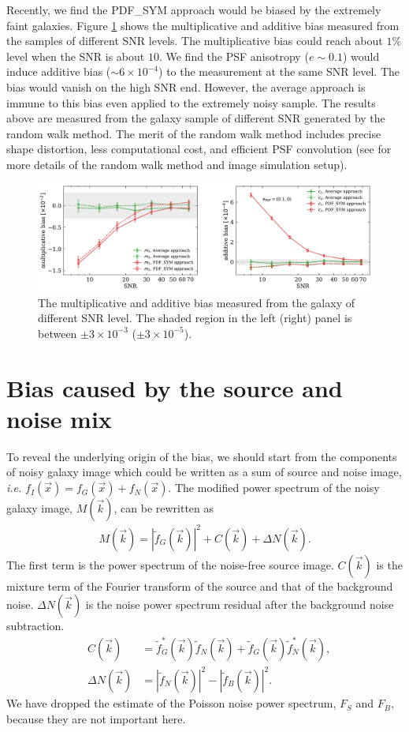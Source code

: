 \documentclass[twocolumn]{aastex62}
\def\ie{{\it i.e. }}
\begin{document}
Recently, we find the PDF\_SYM approach would be biased by the extremely faint galaxies. Figure \ref{fig:pts_mc} shows the multiplicative and additive bias measured from the samples of different SNR levels. The multiplicative bias could reach about $1\%$ level when the SNR is about $10$. We find the PSF anisotropy ($e \sim 0.1$) would induce additive bias ($\sim 6\times 10^{-4}$) to the measurement at the same SNR level. The bias would vanish on the high SNR end. However, the average approach is immune to this bias even applied to the extremely noisy sample. The results above are measured from the galaxy sample of different SNR generated by the random walk method. The merit of the random walk method includes precise shape distortion, less computational cost, and efficient PSF convolution (see \cite{Li2020} for more details of the random walk method and image simulation setup).


\begin{figure}[htbp]
	\centering
	\includegraphics[width=0.9\linewidth]{figures/pts_sample_mc.pdf}
	\caption{The multiplicative and additive bias measured from the galaxy of different SNR level. The shaded region in the left (right) panel is between $\pm 3\times 10^{-3}$ ($\pm 3\times10^{-5}$). }\label{fig:pts_mc}
\end{figure}


\section{Bias caused by the source and noise mix}\label{sec:bias_cal}
To reveal the underlying origin of the bias, we should start from the components of noisy galaxy image which could be written as a sum of source and noise image, \ie$f_I(\vec{x}) = f_G(\vec{x}) + f_N(\vec{x})$. The modified power spectrum of the noisy galaxy image, $M(\vec{k})$, can be rewritten as 
\begin{eqnarray}
M(\vec{k}) =  \left\vert\widetilde{f}_G(\vec{k})\right\vert^2+ C(\vec{k}) + \Delta N(\vec{k}).
\end{eqnarray}
The first term is the power spectrum of the noise-free source image. $C(\vec{k})$ is the mixture term of the Fourier transform of the source and that of the background noise. $\Delta N(\vec{k})$ is the noise power spectrum residual after the background noise subtraction. 
\begin{eqnarray}
& C(\vec{k})& = \widetilde{f}_{G}^{*}(\vec{k})\widetilde{f}_N(\vec{k}) + \widetilde{f}_{G}(\vec{k})\widetilde{f}_{N}^{*}(\vec{k}),\\ \nonumber
&\Delta N(\vec{k})& = \left\vert\widetilde{f}_N(\vec{k})\right\vert^2 -\left\vert\widetilde{f}_B(\vec{k})\right\vert^2.
\end{eqnarray}
We have dropped the estimate of the Poisson noise power spectrum, $F_S$ and $F_B$, because they are not important here. 
\end{document}
